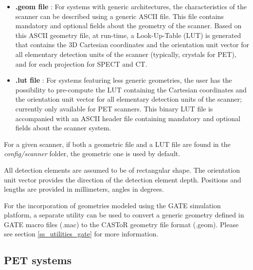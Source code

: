 \documentclass[a4paper, 11pt]{article}
\begin{document}
\begin{itemize}
  \item \textbf{.geom file }: For systems with generic architectures, the characteristics of the scanner can be described using a generic ASCII file. 
        This file contains mandatory and optional fields about the geometry of the scanner.
        Based on this ASCII geometry file, at run-time, a Look-Up-Table (LUT) is generated that contains the 3D Cartesian coordinates and the orientation unit vector for all elementary detection units of the scanner (typically, crystals for PET), and for each projection for SPECT and CT.

  \item \textbf{.lut file }: For systems featuring less generic geometries, the user has the possibility to pre-compute the LUT containing the Cartesian
        coordinates and the orientation unit vector for all elementary detection units of the scanner; currently only available for PET scanners. 
        This binary LUT file is accompanied with an ASCII header file containing mandatory and optional fields about the scanner system.
\end{itemize}

For a given scanner, if both a geometric file and a LUT file are found in the \textit{config/scanner} folder, the geometric one is used by default.

All detection elements are assumed to be of rectangular shape.
The orientation unit vector provides the direction of the detection element depth.
Positions and lengths are provided in millimeters, angles in degrees.  

For the incorporation of geometries modeled using the GATE simulation platform, a separate utility can be used to convert a generic geometry defined in
GATE macro files (.mac) to the CASToR geometry file format (.geom). Please see section \ref{ss_utilities_gate} for more information.

\subsection{PET systems}
\label{ss_scanner_integration_PET}

\end{document}
